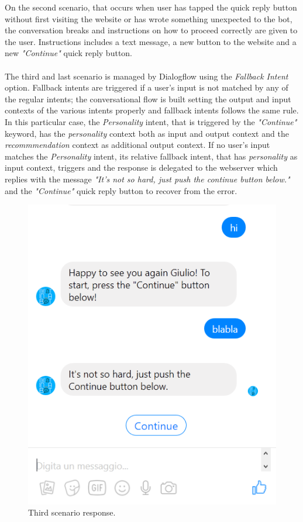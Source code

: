 \documentclass[b5paper,10pt,twoside,cucitura]{toptesi}
\begin{document}
On the second scenario, that occurs when user has tapped the quick reply button without first visiting the website or has wrote something unexpected to the bot, the conversation breaks and instructions on how to proceed correctly are given to the user. Instructions includes a text message, a new button to the website and a new \textit{"Continue"} quick reply button.
\\
\\
The third and last scenario is managed by Dialogflow using the \textit{Fallback Intent} option. Fallback intents are triggered if a user's input is not matched by any of the regular intents; the conversational flow is built setting the output and input contexts of the various intents properly and fallback intents follows the same rule. In this particular case, the \textit{Personality} intent, that is triggered by the \textit{"Continue"} keyword, has the \textit{personality} context both as input and output context and the \textit{recommmendation} context as additional output context. If no user's input matches the \textit{Personality} intent, its relative fallback intent, that has \textit{personality} as input context, triggers and the response is delegated to the webserver which replies with the message \textit{"It's not so hard, just push the continue button below."} and the \textit{"Continue"} quick reply button to recover from the error.

\begin{figure}[ht]
\centering
\includegraphics[scale=0.7]{bot_error2.png}
\caption{Third scenario response.}
\end{figure}
\end{document}
